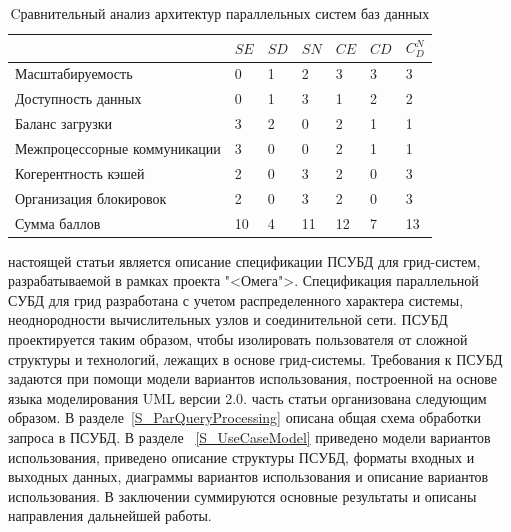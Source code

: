 \documentclass[11pt,oneside]{article}
\begin{document}
\begin{table}[h]
\caption{Cравнительный анализ архитектур параллельных систем баз данных}
\medskip
\begin{tabular}{|p{6cm}||p{0.5cm}||p{0.5cm}||p{0.5cm}||p{0.5cm}||p{0.5cm}||p{0.5cm}|}
\hline
$ $ & $SE$ & $SD$ & $SN$ & $CE$ & $CD$ & $$C_{D}^{N}$$\\
\hline
Масштабируемость & 0 & 1 & 2 & 3 & 3 & 3 \\
\hline
Доступность данных & 0 & 1 & 3 & 1 & 2 & 2 \\
\hline
Баланс загрузки & 3 & 2 & 0 & 2 & 1 & 1 \\
\hline
Межпроцессорные коммуникации & 3 & 0 & 0 & 2 & 1 & 1 \\
\hline
Когерентность кэшей & 2 & 0 & 3 & 2 & 0 & 3 \\
\hline
Организация блокировок & 2 & 0 & 3 & 2 & 0 & 3 \\
\hline
Сумма баллов & 10 & 4 & 11 & 12 & 7 & 13 \\
\hline
\end{tabular}
\label{table1}
\end{table}


 настоящей статьи является описание спецификации ПСУБД для грид-систем, разрабатываемой в рамках проекта "<Омега">\cite{B_OMEGA}. Спецификация параллельной СУБД для грид разработана с учетом распределенного характера системы, неоднородности вычислительных узлов и соединительной сети. ПСУБД проектируется таким образом, чтобы изолировать пользователя от сложной структуры и технологий, лежащих в основе грид-системы. Требования к ПСУБД задаются при помощи модели вариантов использования, построенной на основе языка моделирования UML версии 2.0.
 часть статьи организована следующим образом. В разделе~\ref{S_ParQueryProcessing} описана общая схема обработки запроса в ПСУБД. В разделе ~\ref{S_UseCaseModel} приведено модели вариантов использования, приведено описание структуры ПСУБД, форматы входных и выходных данных, диаграммы вариантов использования и описание вариантов использования. В заключении суммируются основные результаты и описаны направления дальнейшей работы.
\end{document}
